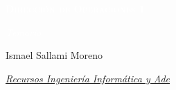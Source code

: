 \documentclass[12pt]{book} %
\begin{document}
\begin{titlepage}
\begin{center}
        \vspace{5cm} %
        {\Huge \bfseries\scshape\textcolor{white}{Dirección de
Operaciones 1} \par}
        \vspace{0.5cm}
        {\Large \itshape\textcolor{white}{Temario} \par}
        \vspace{0.5cm}


        \vfill
        

        \begin{flushright}
            {Ismael Sallami Moreno \par}
            {\small \itshape \href{https://elblogdeismael.github.io}{Recursos Ingeniería Informática y Ade} \par}
        \end{flushright}
        \vspace{0.3cm}
        
        
    \end{center}
    
    \restoregeometry
\end{titlepage}


\end{document}
